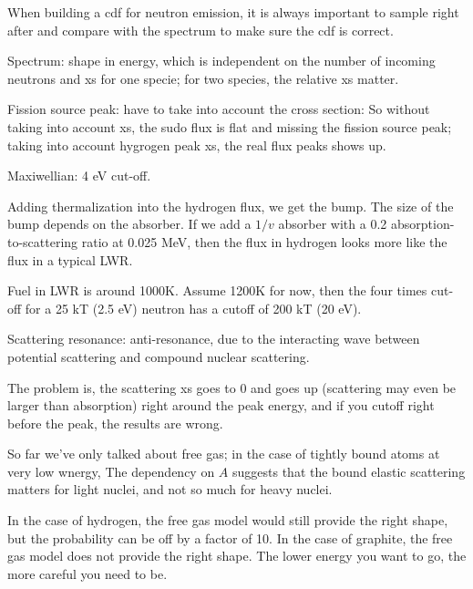 \documentclass{school-22.211-notes}
\begin{document}
When building a cdf for neutron emission, it is always important to sample right after and compare with the spectrum to make sure the cdf is correct. 

Spectrum: shape in energy, which is independent on the number of incoming neutrons and xs for one specie; for two species, the relative xs matter. 

Fission source peak: have to take into account the cross section: 
So without taking into account xs, the sudo flux is flat and missing the fission source peak; taking into account hygrogen peak xs, the real flux peaks shows up. 


Maxiwellian: 4 eV cut-off. 


Adding thermalization into the hydrogen flux, we get the bump. The size of the bump depends on the absorber. If we add a $1/v$ absorber with a 0.2 absorption-to-scattering ratio at 0.025 MeV, then the flux in hydrogen looks more like the flux in a typical LWR. 


Fuel in LWR is around 1000K. Assume 1200K for now, then the four times cut-off for a 25 kT (2.5 eV) neutron has a cutoff of 200 kT (20 eV). 

Scattering resonance: anti-resonance, due to the interacting wave between potential scattering and compound nuclear scattering. 

The problem is, the scattering xs goes to 0 and goes up (scattering may even be larger than absorption) right around the peak energy, and if you cutoff right before the peak, the results are wrong. 

So far we've only talked about free gas; in the case of tightly bound atoms at very low wnergy, 
The dependency on $A$ suggests that the bound elastic scattering matters for light nuclei, and not so much for heavy nuclei. 

In the case of hydrogen, the free gas model would still provide the right shape, but the probability can be off by a factor of 10. In the case of graphite, the free gas model does not provide the right shape. The lower energy you want to go, the more careful you need to be. 
\end{document}

